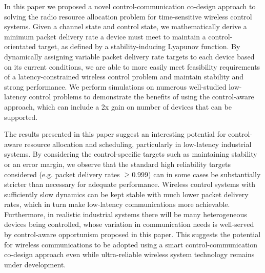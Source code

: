 In this paper we proposed a novel control-communication co-design approach to solving the radio resource
allocation problem for time-sensitive wireless control systems. Given a channel state and control state, we mathematically derive a minimum packet delivery
rate a device must meet to maintain a control-orientated target,
as defined by a stability-inducing Lyapunov function. By
dynamically assigning variable packet delivery rate targets
to each device based on its current conditions, we are able to
more easily meet feasibility requirements of a latency-constrained
wireless control problem and maintain stability
and strong performance. We perform simulations on numerous
well-studied low-latency control problems to demonstrate the
benefits of using the control-aware approach, which can include
a 2x gain on number of devices that can be supported.

The results presented in this paper suggest an interesting
potential for control-aware resource allocation and scheduling, particularly in low-latency industrial systems. By considering the control-specific targets such as maintaining
stability or an error margin, we observe that the standard
high reliability targets considered (e.g. packet delivery rates $\geq 0.999$) can in some cases be substantially stricter than
necessary for adequate performance. Wireless control systems
with sufficiently slow dynamics can be kept stable with much
lower packet delivery rates, which in turn make low-latency
communications more achievable. Furthermore, in realistic industrial systems there will be many heterogeneous devices being controlled, whose variation in communication needs is well-served by control-aware opportunism proposed in this paper. This suggests the potential for wireless communications to be adopted using a smart control-communication co-design approach even
while ultra-reliable wireless system technology remains under development.